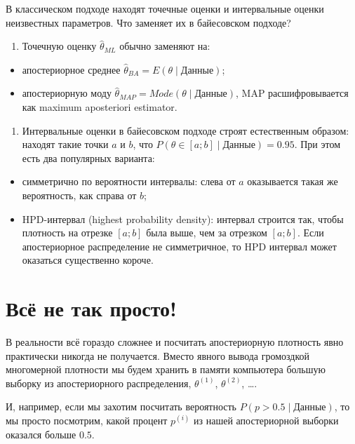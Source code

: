 \documentclass[11pt,russian,]{article}
\providecommand{\tightlist}{%
  \setlength{\itemsep}{0pt}\setlength{\parskip}{0pt}}
\begin{document}
В классическом подходе находят точечные оценки и интервальные оценки
неизвестных параметров. Что заменяет их в байесовском подходе?

\begin{enumerate}
\def\labelenumi{\arabic{enumi}.}
\tightlist
\item
  Точечную оценку \(\hat\theta_{ML}\) обычно заменяют на:
\end{enumerate}

\begin{itemize}
\tightlist
\item
  апостериорное среднее
  \(\hat\theta_{BA}=E(\theta \mid \text{Данные})\);
\item
  апостериорную моду
  \(\hat\theta_{MAP}=Mode(\theta \mid \text{Данные})\), MAP
  расшифровывается как maximum aposteriori estimator.
\end{itemize}

\begin{enumerate}
\def\labelenumi{\arabic{enumi}.}
\tightlist
\item
  Интервальные оценки в байесовском подходе строят естественным образом:
  находят такие точки \(a\) и \(b\), что
  \(P(\theta \in [a;b] \mid \text{Данные}) = 0.95\). При этом есть два
  популярных варианта:
\end{enumerate}

\begin{itemize}
\tightlist
\item
  симметрично по вероятности интервалы: слева от \(a\) оказывается такая
  же вероятность, как справа от \(b\);
\item
  HPD-интервал (highest probability density): интервал строится так,
  чтобы плотность на отрезке \([a;b]\) была выше, чем за отрезком
  \([a;b]\). Если апостериорное распределение не симметричное, то HPD
  интервал может оказаться существенно короче.
\end{itemize}

\section{Всё не так просто!}\label{---}

В реальности всё гораздо сложнее и посчитать апостериорную плотность
явно практически никогда не получается. Вместо явного вывода громоздкой
многомерной плотности мы будем хранить в памяти компьютера большую
выборку из апостериорного распределения, \(\theta^{(1)}\),
\(\theta^{(2)}\), \ldots.

И, например, если мы захотим посчитать вероятность
\(P(p>0.5 \mid \text{Данные})\), то мы просто посмотрим, какой процент
\(p^{(i)}\) из нашей апостериорной выборки оказался больше \(0.5\).
\end{document}
